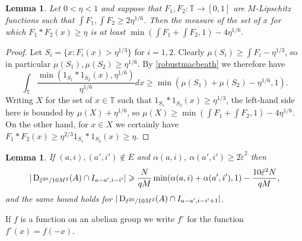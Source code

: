 \documentclass[10pt,reqno]{amsart}
\newtheorem{lemma}[theorem]{Lemma}
\theoremstyle{definition}
\theoremstyle{remark}
\renewcommand{\geq}{\geqslant}
\def\T{\mathbb{T}}
\def\eps{\varepsilon}
\numberwithin{equation}{section}
\begin{document}
\begin{lemma}\label{lipschitz-sum}
Let $0<\eta<1$ and suppose that $F_1, F_2 : \T \rightarrow [0,1]$ are $M$-Lipschitz functions such that $\int F_1, \int F_2 \geq 2\eta^{1/6}$. Then the measure of the set of $x$ for which $F_1 \ast F_2(x) \geq \eta$ is at least $\min\left(\int F_1 + \int F_2, 1\right) - 4\eta^{1/6}$.
\end{lemma}
\begin{proof}
Let $S_i = \{ x : F_i(x) > \eta^{1/3}\}$ for $i = 1,2$. Clearly $\mu(S_i) \geq \int F_i - \eta^{1/3}$, so in particular $\mu(S_1), \mu(S_2)\geq \eta^{1/6}$. By \eqref{robustmacbeath} we therefore have
\[ \int_{\T} \frac{\min(1_{S_1} \ast 1_{S_2}(x), \eta^{1/6})}{\eta^{1/6}} dx \geq  \min(\mu(S_1) + \mu(S_2) - \eta^{1/6}, 1).\]
Writing $X$ for the set of $x\in\T$ such that $1_{S_1} \ast 1_{S_2}(x) \geq \eta^{1/3}$, the left-hand side here is bounded by $\mu(X) + \eta^{1/6}$, so $\mu(X) \geq \min(\int F_1 + \int F_2, 1) - 4\eta^{1/6}$. On the other hand, for $x \in X$ we certainly have $F_1 \ast F_2(x) \geq \eta^{2/3} 1_{S_1}\ast1_{S_2}(x)\geq \eta$.
\end{proof}

\begin{lemma}\label{lem0.6}
If $(a,i),(a',i')\notin E$ and $\alpha(a,i)$, $\alpha(a',i') \geq 2{\tilde\eps}^2$ then 
\[ |\Sym_{{\tilde\eps}^{20}/10M^2}(A) \cap I_{a-a',i-i'}| \geq \frac{N}{qM} \min( \alpha(a,i) + \alpha(a',i'), 1)- \frac{10{\tilde\eps}^2 N}{qM},\]
and the same bound holds for $|\Sym_{{\tilde\eps}^{20}/10M^2}(A) \cap I_{a-a',i-i'+1}|$.
\end{lemma}

If $f$ is a function on an abelian group we write $f^\circ$ for the function $f^\circ(x) = f(-x)$.
\end{document}
